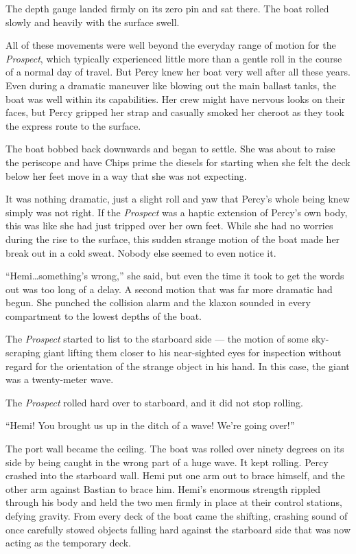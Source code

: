 \documentclass[
]{scrbook}
\begin{document}
The depth gauge landed firmly on its zero pin and sat there. The boat
rolled slowly and heavily with the surface swell.

All of these movements were well beyond the everyday range of motion for
the \emph{Prospect}, which typically experienced little more than a
gentle roll in the course of a normal day of travel. But Percy knew her
boat very well after all these years. Even during a dramatic maneuver
like blowing out the main ballast tanks, the boat was well within its
capabilities. Her crew might have nervous looks on their faces, but
Percy gripped her strap and casually smoked her cheroot as they took the
express route to the surface.

The boat bobbed back downwards and began to settle. She was about to
raise the periscope and have Chips prime the diesels for starting when
she felt the deck below her feet move in a way that she was not
expecting.

It was nothing dramatic, just a slight roll and yaw that Percy's whole
being knew simply was not right. If the \emph{Prospect} was a haptic
extension of Percy's own body, this was like she had just tripped over
her own feet. While she had no worries during the rise to the surface,
this sudden strange motion of the boat made her break out in a cold
sweat. Nobody else seemed to even notice it.

``Hemi\ldots something's wrong,'' she said, but even the time it took to
get the words out was too long of a delay. A second motion that was far
more dramatic had begun. She punched the collision alarm and the klaxon
sounded in every compartment to the lowest depths of the boat.

The \emph{Prospect} started to list to the starboard side --- the motion
of some sky-scraping giant lifting them closer to his near-sighted eyes
for inspection without regard for the orientation of the strange object
in his hand. In this case, the giant was a twenty-meter wave.

The \emph{Prospect} rolled hard over to starboard, and it did not stop
rolling.

``Hemi! You brought us up in the ditch of a wave! We're going over!''

The port wall became the ceiling. The boat was rolled over ninety
degrees on its side by being caught in the wrong part of a huge wave. It
kept rolling. Percy crashed into the starboard wall. Hemi put one arm
out to brace himself, and the other arm against Bastian to brace him.
Hemi's enormous strength rippled through his body and held the two men
firmly in place at their control stations, defying gravity. From every
deck of the boat came the shifting, crashing sound of once carefully
stowed objects falling hard against the starboard side that was now
acting as the temporary deck.
\end{document}
